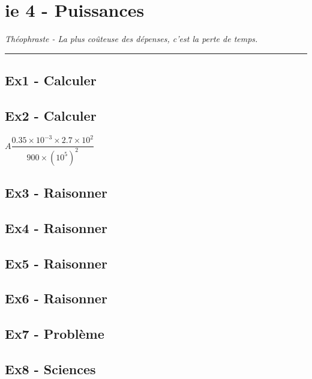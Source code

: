 \documentclass[12pt]{article}
\newcommand{\horrule}[1]{\rule{\linewidth}{#1}} %
\begin{document}

\newtheorem{Definition}{Définition}
\newtheorem{Theorem}{Théorème}
\newtheorem{Proposition}{Propriété}

\renewcommand{\labelitemi}{$\bullet$}
\renewcommand{\labelitemii}{$\circ$}

\setlength{\columnseprule}{1pt}

\section*{ie 4 - Puissances}
\begin{center}
  \textit{Théophraste - La plus coûteuse des dépenses, c’est la perte de temps.}
\end{center}
\horrule{2px}

\subsection*{Ex1 - Calculer}

\subsection*{Ex2 - Calculer}

 \begin{multicols}{2}

    $ A \dfrac{0.35 \times 10^{-3} \times 2.7 \times 10^{2}}{900 \times (10^5)^2} $ \\

\end{multicols}

\subsection*{Ex3 - Raisonner}

\subsection*{Ex4 - Raisonner}

\subsection*{Ex5 - Raisonner}

\subsection*{Ex6 - Raisonner}

\subsection*{Ex7 - Problème}

\subsection*{Ex8 - Sciences}
\end{document}
